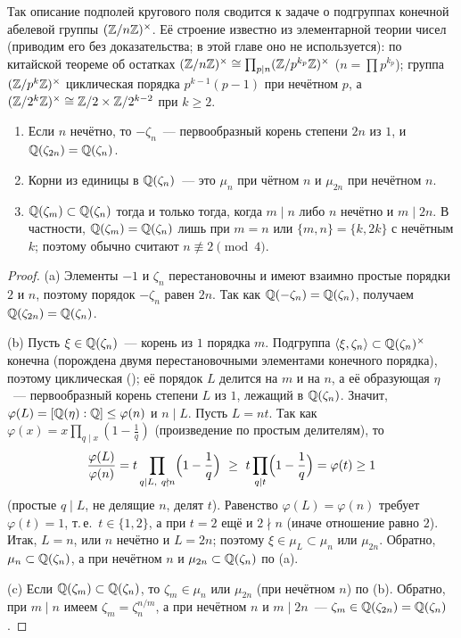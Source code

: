 Так описание подполей кругового поля сводится к задаче о подгруппах конечной абелевой группы $(\mathbb Z/n\mathbb Z)^\times$. Её
строение известно из элементарной теории чисел (приводим его без доказательства; в этой главе оно не используется): по
китайской теореме об остатках $(\mathbb Z/n\mathbb Z)^\times\cong\prod_{p\mid n}(\mathbb Z/p^{k_p}\mathbb Z)^\times$
($n=\prod p^{k_p}$); группа $(\mathbb Z/p^k\mathbb Z)^\times$ циклическая порядка $p^{k-1}(p-1)$ при нечётном $p$, а
$(\mathbb Z/2^k\mathbb Z)^\times\cong\mathbb Z/2\times\mathbb Z/2^{k-2}$ при $k\ge2$.

\begin{proposition}
\begin{enumerate}[label=\textup{(\alph*)}]
\item Если $n$ нечётно, то $-\zeta_n$~--- первообразный корень степени $2n$ из $1$, и $\mathbb Q(\zeta_{2n})=\mathbb Q(\zeta_n)$.
\item Корни из единицы в $\mathbb Q(\zeta_n)$~--- это $\mu_n$ при чётном $n$ и $\mu_{2n}$ при нечётном $n$.
\item $\mathbb Q(\zeta_m)\subset\mathbb Q(\zeta_n)$ тогда и только тогда, когда $m\mid n$ либо $n$ нечётно и $m\mid2n$. В частности,
$\mathbb Q(\zeta_m)=\mathbb Q(\zeta_n)$ лишь при $m=n$ или $\{m,n\}=\{k,2k\}$ с нечётным $k$; поэтому обычно считают $n\not\equiv2\pmod4$.
\end{enumerate}
\end{proposition}

\begin{proof}
(a) Элементы $-1$ и $\zeta_n$ перестановочны и имеют взаимно простые порядки $2$ и $n$, поэтому порядок $-\zeta_n$ равен
$2n$. Так как $\mathbb Q(-\zeta_n)=\mathbb Q(\zeta_n)$, получаем $\mathbb Q(\zeta_{2n})=\mathbb Q(\zeta_n)$.

(b) Пусть $\xi\in\mathbb Q(\zeta_n)$~--- корень из $1$ порядка $m$. Подгруппа $\langle\xi,\zeta_n\rangle\subset\mathbb Q(\zeta_n)^\times$
конечна (порождена двумя перестановочными элементами конечного порядка), поэтому циклическая (); её порядок $L$
делится на $m$ и на $n$, а её образующая $\eta$~--- первообразный корень степени $L$ из $1$, лежащий в $\mathbb Q(\zeta_n)$. Значит,
$\varphi(L)=[\mathbb Q(\eta):\mathbb Q]\le\varphi(n)$ и $n\mid L$. Пусть $L=nt$. Так как $\varphi(x)=x\prod_{q\mid x}(1-\frac1q)$
(произведение по простым делителям), то
\[
\frac{\varphi(L)}{\varphi(n)}=t\prod_{q\mid L,\ q\nmid n}\Bigl(1-\frac1q\Bigr)\ \ge\ t\prod_{q\mid t}\Bigl(1-\frac1q\Bigr)=\varphi(t)\ge1
\]
(простые $q\mid L$, не делящие $n$, делят $t$). Равенство $\varphi(L)=\varphi(n)$ требует $\varphi(t)=1$, т.\,е.\ $t\in\{1,2\}$,
а при $t=2$ ещё и $2\nmid n$ (иначе отношение равно $2$). Итак, $L=n$, или $n$ нечётно и $L=2n$; поэтому
$\xi\in\mu_L\subset\mu_n$ или $\mu_{2n}$. Обратно, $\mu_n\subset\mathbb Q(\zeta_n)$, а при нечётном $n$ и $\mu_{2n}\subset\mathbb Q(\zeta_n)$
по (a).

(c) Если $\mathbb Q(\zeta_m)\subset\mathbb Q(\zeta_n)$, то $\zeta_m\in\mu_n$ или $\mu_{2n}$ (при нечётном $n$) по (b). Обратно, при $m\mid n$
имеем $\zeta_m=\zeta_n^{n/m}$, а при нечётном $n$ и $m\mid2n$~--- $\zeta_m\in\mathbb Q(\zeta_{2n})=\mathbb Q(\zeta_n)$.
\end{proof}

